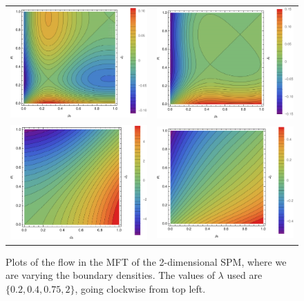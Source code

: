 \begin{figure}
\caption[$2$d SPM MFT current flow due to boundaries, for a selection of $\lambda$.]{Plots of the flow in the MFT of the 2-dimensional SPM, where we are varying the boundary densities. The values of $\lambda$ used are $\{0.2, 0.4, 0.75, 2 \}$, going clockwise from top left.} \label{fig:2dFlows}
\begin{center}
 \begin{tabular}{c  c}
    \includegraphics[width=0.5\linewidth]{analytics/images/mftCurrent2d/mftCurrent2dlp2}  & \includegraphics[width=0.5\linewidth]{analytics/images/mftCurrent2d/mftCurrent2dlp4} \\
    \includegraphics[width=0.5\linewidth]{analytics/images/mftCurrent2d/mftCurrent2dl2}  & \includegraphics[width=0.5\linewidth]{analytics/images/mftCurrent2d/mftCurrent2dlp75} \\
    \end{tabular}
\end{center}
    \vspace{-2em}
\end{figure}

